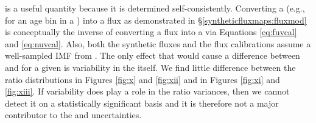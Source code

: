 \documentclass[iop, tighten]{emulateapj}
\begin{document}
\figxii

\figxiii

\sfrxz{} is a useful quantity because it is determined self-consistently.
Converting a \sfr{} (e.g., for an age bin in a \sfh{}) into a flux as
demonstrated in \S \ref{syntheticfluxmaps:fluxmod} is conceptually the inverse
of converting a flux into a \sfr{} via Equations \ref{eq:fuvcal} and
\ref{eq:nuvcal}. Also, both the synthetic fluxes and the flux calibrations
assume a well-sampled IMF from \citet{Kroupa:2001}. The only effect that would
cause a difference between \sfroneh{} and \sfrxz{} for a given \sfh{} is
variability in the \sfh{} itself. We find little difference between the \sfr{}
ratio distributions in Figures \ref{fig:x} and \ref{fig:xii}
and in Figures \ref{fig:xi} and \ref{fig:xiii}. If \sfh{}
variability does play a role in the \sfr{} ratio variances, then we cannot
detect it on a statistically significant basis and it is therefore not a major
contributor to the \sfrx{} and \sfrxz{} uncertainties.

%
%
%
\end{document}

